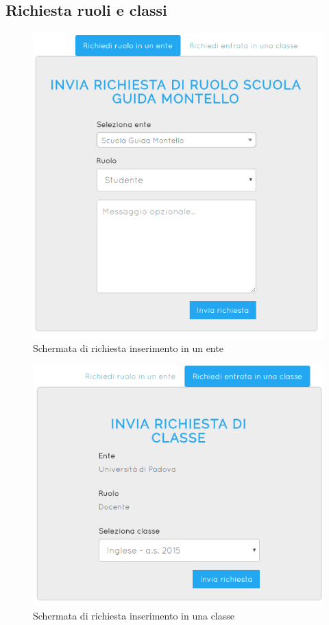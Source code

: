 \documentclass[a4paper, titlepage]{article}
\begin{document}
	\newpage
	\subsection{Richiesta ruoli e classi}
	\begin{figure}[!h]
		\centering
		\includegraphics[scale=0.33]{Img/screen_RichiestaRuolo.png}
		\caption{Schermata di richiesta inserimento in un ente}
	\end{figure}	
	\begin{figure}[!h]
		\centering
		\includegraphics[scale=0.33]{Img/screen_RichiestaClasse.png}
		\caption{Schermata di richiesta inserimento in una classe}
	\end{figure}
\end{document}
